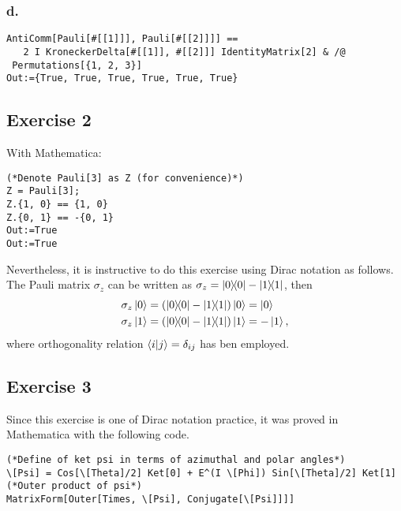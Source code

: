 \subsubsection{d.}
\begin{verbatim}
AntiComm[Pauli[#[[1]]], Pauli[#[[2]]]] == 
   2 I KroneckerDelta[#[[1]], #[[2]]] IdentityMatrix[2] & /@ 
 Permutations[{1, 2, 3}]
Out:={True, True, True, True, True, True}
\end{verbatim}

\subsection{Exercise 2}\noindent
With Mathematica:
\begin{verbatim}
(*Denote Pauli[3] as Z (for convenience)*)
Z = Pauli[3];
Z.{1, 0} == {1, 0}
Z.{0, 1} == -{0, 1}
Out:=True
Out:=True
\end{verbatim}
Nevertheless, it is instructive to do this exercise using Dirac notation as follows. The Pauli matrix
$\sigma_z$ can be written as $\sigma_z=\dyad{0}{0}-\dyad{1}{1}$, then
\begin{align}
\sigma_z \ket{0}&=\qty(\dyad{0}{0}-\dyad{1}{1})\ket{0}=\ket{0}\\
\sigma_z \ket{1}&=\qty(\dyad{0}{0}-\dyad{1}{1})\ket{1}=-\ket{1},
\end{align}
where orthogonality relation $\braket{i}{j}=\delta_{ij}$ has ben employed.

\subsection{Exercise 3}\noindent
Since this exercise is one of Dirac notation practice, it was proved 
in Mathematica with the following code.
\begin{verbatim}
(*Define of ket psi in terms of azimuthal and polar angles*)
\[Psi] = Cos[\[Theta]/2] Ket[0] + E^(I \[Phi]) Sin[\[Theta]/2] Ket[1]
(*Outer product of psi*)
MatrixForm[Outer[Times, \[Psi], Conjugate[\[Psi]]]]
\end{verbatim}


